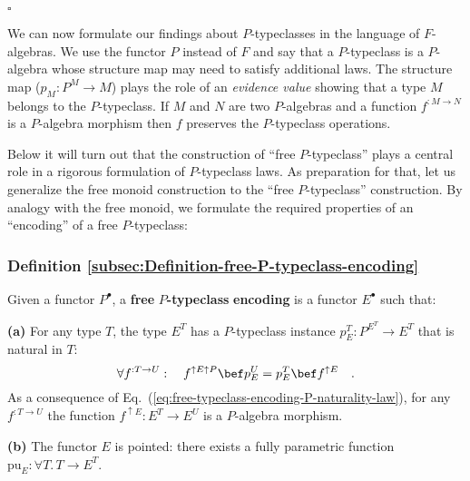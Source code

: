 $\square$

We can now formulate our findings about $P$-typeclasses in the language
of $F$-algebras. We use the functor $P$ instead of $F$ and say
that a $P$-typeclass is a $P$-algebra whose structure map may need
to satisfy additional laws. The structure map ($p_{M}:P^{M}\rightarrow M$)
plays the role of an \emph{evidence value} showing that a type $M$
belongs to the $P$-typeclass. If $M$ and $N$ are two $P$-algebras
and a function $f^{:M\rightarrow N}$ is a $P$-algebra morphism then
$f$ preserves the $P$-typeclass operations. 

Below it will turn out that the construction of \textsf{``}free $P$-typeclass\textsf{''}
plays a central role in a rigorous formulation of $P$-typeclass laws.
As preparation for that, let us generalize the free monoid construction
to the \textsf{``}free $P$-typeclass\textsf{''} construction. By analogy with the
free monoid, we formulate the required properties of an \textsf{``}encoding\textsf{''}
of a free $P$-typeclass:

\subsubsection{Definition \label{subsec:Definition-free-P-typeclass-encoding}\ref{subsec:Definition-free-P-typeclass-encoding}}

Given a functor $P^{\bullet}$, a \textbf{free} $P$\textbf{-typeclass}
\textbf{encoding} is a functor $E^{\bullet}$ such that:

\textbf{(a)} For any type $T$, the type $E^{T}$ has a $P$-typeclass
instance $p_{E}^{T}:P^{E^{T}}\rightarrow E^{T}$ that is natural in
$T$:
\begin{equation}
\forall f^{:T\rightarrow U}:\quad f^{\uparrow E\uparrow P}\bef p_{E}^{U}=p_{E}^{T}\bef f^{\uparrow E}\quad.\label{eq:free-typeclass-encoding-P-naturality-law}
\end{equation}
 As a consequence of Eq.~(\ref{eq:free-typeclass-encoding-P-naturality-law}),
for any $f^{:T\rightarrow U}$ the function $f^{\uparrow E}:E^{T}\rightarrow E^{U}$
is a $P$-algebra morphism.

\textbf{(b)} The functor $E$ is pointed: there exists a fully parametric
function $\text{pu}_{E}:\forall T.\,T\rightarrow E^{T}$.

